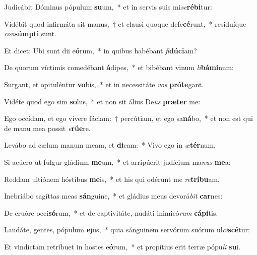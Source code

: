 \item Judicábit Dóminus pópulum \textbf{su}um,~* et in servis suis mi\textit{se}\textbf{ré}\textbf{bi}tur:
\item Vidébit quod infirmáta sit manus,~† et clausi quoque defe\textbf{cé}runt,~* residuíque \textit{con}\textbf{súmp}\textbf{ti} sunt.
\item Et dicet: Ubi sunt dii e\textbf{ó}rum,~* in quibus habébant \textit{fi}\textbf{dú}\textbf{ci}am?
\item De quorum víctimis comedébant \textbf{á}dipes,~* et bibébant vinum \textit{li}\textbf{bá}\textbf{mi}num:
\item Surgant, et opituléntur \textbf{vo}bis,~* et in necessitáte \textit{vos} \textbf{pró}\textbf{te}gant.
\item Vidéte quod ego sim \textbf{so}lus,~* et non sit álius De\textit{us} \textbf{præ}\textbf{ter} me:
\item Ego occídam, et ego vívere fáciam:~† percútiam, et ego sa\textbf{ná}bo,~* et non est qui de manu mea possit \textit{e}\textbf{rú}\textbf{e}re.
\item Levábo ad cælum manum meam, et \textbf{di}cam:~* Vivo ego in \textit{æ}\textbf{tér}num.
\item Si acúero ut fulgur gládium \textbf{me}um,~* et arripúerit judícium ma\textit{nus} \textbf{me}a:
\item Reddam ultiónem hóstibus \textbf{me}is,~* et his qui odérunt me \textit{re}\textbf{trí}\textbf{bu}am.
\item Inebriábo sagíttas meas \textbf{sán}guine,~* et gládius meus devorá\textit{bit} \textbf{car}nes:
\item De cruóre occi\textbf{só}rum,~* et de captivitáte, nudáti inimicó\textit{rum} \textbf{cá}\textbf{pi}tis.
\item Laudáte, gentes, pópulum \textbf{e}jus,~* quia sánguinem servórum suórum ul\textit{ci}\textbf{scé}tur:
\item Et vindíctam retríbuet in hostes e\textbf{ó}rum,~* et propítius erit terræ pópu\textit{li} \textbf{su}i.
